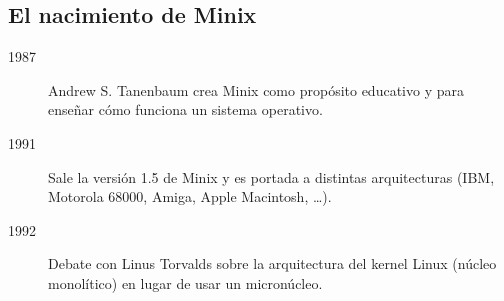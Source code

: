 \subsection{El nacimiento de Minix}
\begin{description}
\item[1987]Andrew S. Tanenbaum crea  Minix como propósito educativo y para enseñar cómo funciona un sistema operativo.

\item[1991]Sale la versión 1.5 de Minix y es portada a distintas arquitecturas (IBM, Motorola 68000, Amiga, Apple Macintosh, …).

\item[1992]Debate con Linus Torvalds sobre la arquitectura del kernel Linux (núcleo monolítico) en lugar de usar un micronúcleo.

\end{description}


